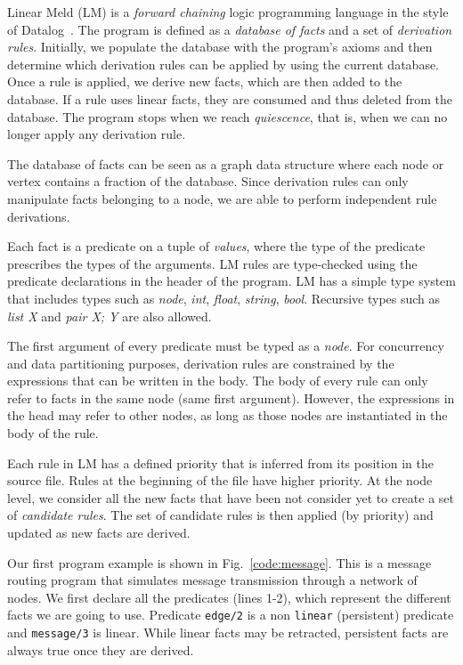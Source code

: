 
Linear Meld (LM) is a \emph{forward chaining} logic programming language in the style of Datalog~\cite{Ullman:1990:PDK:533142}. The program is defined as a \emph{database of facts} and a set of \emph{derivation rules}.
Initially, we populate the database with the program's axioms and then determine which derivation rules can be applied by using the current database. Once a rule is applied, we derive new facts, which are then added to the database.
If a rule uses linear facts, they are consumed and thus deleted from the database.
The program stops when we reach \emph{quiescence}, that is, when we can no longer
apply any derivation rule.

The database of facts can be seen as a graph data structure where each node or vertex contains a
fraction of the database.  Since derivation rules can only manipulate facts belonging to
a node, we are able to perform independent rule derivations.

Each fact is a predicate on a tuple of \emph{values}, where the type of the predicate prescribes the types of the arguments.
LM rules are type-checked using the predicate declarations in the header of the program. LM has a simple type system that includes types such as
\emph{node}, \emph{int}, \emph{float}, \emph{string}, \emph{bool}. Recursive types such as \emph{list X} and \emph{pair X; Y} are
also allowed.

The first argument of every predicate must be typed as a \emph{node}.
For concurrency and data partitioning purposes, derivation rules are constrained by the expressions that can be written in the body.
The body of every rule can only refer to facts in the same node (same first argument).
However, the expressions in the head may refer to other nodes, as long as those nodes are instantiated in the body of the rule.

Each rule in LM has a defined priority that is inferred from its position in the source file.
Rules at the beginning of the file have higher priority. At the node level, we consider all
the new facts that have been not consider yet to create a set of \emph{candidate rules}.
The set of candidate rules is then applied (by priority) and updated as new facts are derived.

Our first program example is shown in Fig.~\ref{code:message}. This is a message routing program
that simulates message transmission through a network of nodes.
We first declare all the predicates (lines 1-2), which represent the different facts we are going to
use.
Predicate \texttt{edge/2} is a non \texttt{linear} (persistent) predicate and \texttt{message/3} is linear. While linear facts may be retracted, persistent facts are always
true once they are derived.

